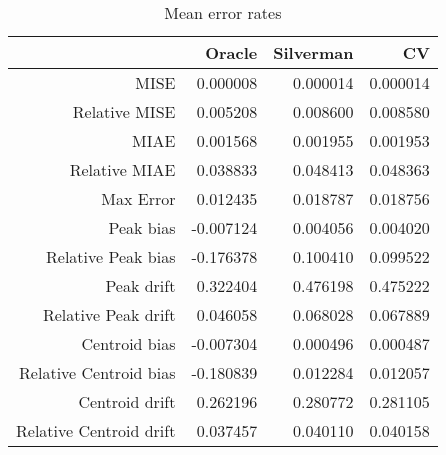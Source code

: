 \begin{table}[ht]
\centering
\begin{tabular}{rrrr}
  \hline
 & Oracle & Silverman & CV \\ 
  \hline
MISE & 0.000008 & 0.000014 & 0.000014 \\ 
  Relative MISE & 0.005208 & 0.008600 & 0.008580 \\ 
  MIAE & 0.001568 & 0.001955 & 0.001953 \\ 
  Relative MIAE & 0.038833 & 0.048413 & 0.048363 \\ 
  Max Error & 0.012435 & 0.018787 & 0.018756 \\ 
  Peak bias & -0.007124 & 0.004056 & 0.004020 \\ 
  Relative Peak bias & -0.176378 & 0.100410 & 0.099522 \\ 
  Peak drift & 0.322404 & 0.476198 & 0.475222 \\ 
  Relative Peak drift & 0.046058 & 0.068028 & 0.067889 \\ 
  Centroid bias & -0.007304 & 0.000496 & 0.000487 \\ 
  Relative Centroid bias & -0.180839 & 0.012284 & 0.012057 \\ 
  Centroid drift & 0.262196 & 0.280772 & 0.281105 \\ 
  Relative Centroid drift & 0.037457 & 0.040110 & 0.040158 \\ 
   \hline
\end{tabular}
\caption{Mean error rates} 
\label{tbl:mean_error_rates}
\end{table}
